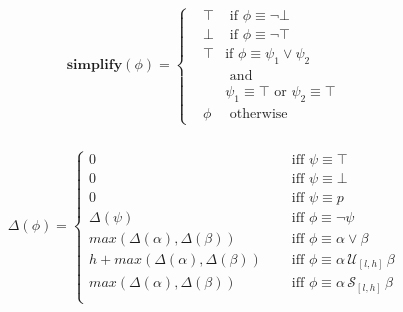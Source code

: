 \documentclass[10pt,a4paper]{article}
\begin{document}
\begin{align*}
\mathbf{simplify}(\phi) = \left\{
\begin{aligned}
&\top &\text{ if } \phi \equiv \neg \bot \\
&\bot &\text{ if } \phi \equiv \neg \top \\
&\top &\text {if } \phi \equiv \psi_1 \vee \psi_2 \\
& &\text{ and } \\ & & \psi_1 \equiv \top \text{ or } \psi_2 \equiv \top \\
&\phi &\text{ otherwise}
\end{aligned} \right. \\
\end{align*}




\begin{align*}
\Delta(\phi) = \left\lbrace
\begin{aligned}
0 & \quad \text{ iff } \psi \equiv \top \\
0 & \quad \text{ iff } \psi \equiv \bot \\
0 & \quad \text{ iff } \psi \equiv p \\
\Delta(\psi) & \quad \text{ iff } \phi \equiv \neg \psi \\
max(\Delta(\alpha),\Delta(\beta)) & \quad \text{ iff } \phi \equiv \alpha \vee \beta \\
h + max(\Delta(\alpha),\Delta(\beta)) & \quad \text{ iff } \phi \equiv \alpha\, \mathcal{U}_{[l,h]}\, \beta \\
max(\Delta(\alpha),\Delta(\beta)) & \quad \text{ iff } \phi \equiv \alpha\, \mathcal{S}_{[l,h]}\, \beta \\
\end{aligned} \right. 
\end{align*}
\end{document}
